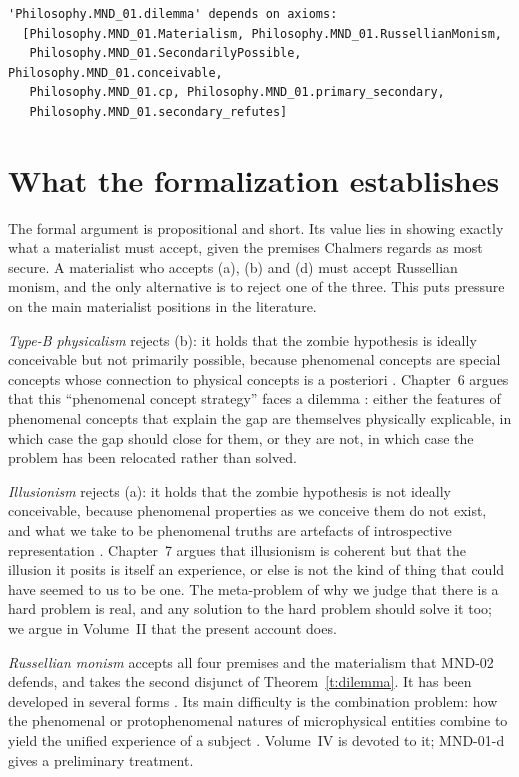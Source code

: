 \documentclass{situationist-preprint}
\begin{document}
\begin{lstlisting}
'Philosophy.MND_01.dilemma' depends on axioms:
  [Philosophy.MND_01.Materialism, Philosophy.MND_01.RussellianMonism,
   Philosophy.MND_01.SecondarilyPossible, Philosophy.MND_01.conceivable,
   Philosophy.MND_01.cp, Philosophy.MND_01.primary_secondary,
   Philosophy.MND_01.secondary_refutes]
\end{lstlisting}

\section{What the formalization establishes}

The formal argument is propositional and short. Its value lies in showing exactly what a materialist must accept, given the premises Chalmers regards as most secure. A materialist who accepts (a), (b) and (d) must accept Russellian monism, and the only alternative is to reject one of the three. This puts pressure on the main materialist positions in the literature.

\emph{Type-B physicalism} rejects (b): it holds that the zombie hypothesis is ideally conceivable but not primarily possible, because phenomenal concepts are special concepts whose connection to physical concepts is a posteriori \citep{Loar1990,Papineau2002,Balog2012}. Chapter~6 argues that this \enquote{phenomenal concept strategy} faces a dilemma \citep{Chalmers2007}: either the features of phenomenal concepts that explain the gap are themselves physically explicable, in which case the gap should close for them, or they are not, in which case the problem has been relocated rather than solved.

\emph{Illusionism} rejects (a): it holds that the zombie hypothesis is not ideally conceivable, because phenomenal properties as we conceive them do not exist, and what we take to be phenomenal truths are artefacts of introspective representation \citep{Dennett1991,Frankish2016}. Chapter~7 argues that illusionism is coherent but that the illusion it posits is itself an experience, or else is not the kind of thing that could have seemed to us to be one. The meta-problem of why we judge that there is a hard problem \citep{Chalmers2018} is real, and any solution to the hard problem should solve it too; we argue in Volume~II that the present account does.

\emph{Russellian monism} accepts all four premises and the materialism that MND-02 defends, and takes the second disjunct of Theorem~\ref{t:dilemma}. It has been developed in several forms \citep{Strawson2006,Goff2017,AlterNagasawa2015}. Its main difficulty is the combination problem: how the phenomenal or protophenomenal natures of microphysical entities combine to yield the unified experience of a subject \citep{Coleman2014}. Volume~IV is devoted to it; MND-01-d gives a preliminary treatment.
\end{document}

